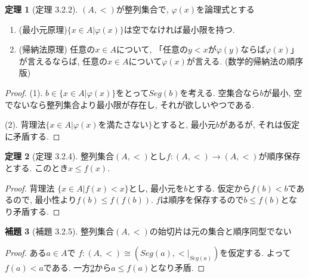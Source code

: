 \documentclass[dvipdfmx,a4paper,11pt]{report}
\theoremstyle{definition}
\newtheorem{thm}{定理}
\newtheorem{lem}[thm]{補題}
\begin{document}
 \begin{tcolorbox}
 [colback = white, colframe = green!35!black, fonttitle = \bfseries,breakable = true]
 \begin{thm}[定理 3.2.2]
 $(A,<)$が整列集合で, $\varphi(x)$を論理式とする
 \begin{enumerate}
 \item (最小元原理)$\{ x \in A | \varphi (x) \}$は空でなければ最小限を持つ.
 \item (帰納法原理) 任意の$x \in A$について, 「任意の$y<x$が$\varphi(y)$ならば$\varphi(x)$」が言えるならば, 任意の$x \in A$について$\varphi(x)$が言える. (数学的帰納法の順序版)
 \end{enumerate}
 \end{thm}
 \end{tcolorbox}
 \begin{proof}
 (1). $b \in \{ x \in A | \varphi (x)\}$をとって$Seg(b)$を考える. 空集合なら$b$が最小, 空でないなら整列集合より最小限が存在し, それが欲しいやつである.
 
 (2). 背理法$\{ x \in A | \varphi (x)\text{を満たさない}\}$とすると, 最小元$b$があるが, それは仮定に矛盾する. 
 \end{proof}

 \begin{tcolorbox}
 [colback = white, colframe = green!35!black, fonttitle = \bfseries,breakable = true]
\begin{thm}[定理 3.2.4]
\label{thm-tanaka-3.2.4}
整列集合$(A,<)$とし$f : (A,<) \to (A,<)$が順序保存とする. 
このとき$x \le f(x)$.
\end{thm}
\end{tcolorbox}
\begin{proof}
背理法 $\{ x \in A | f(x) <x \}$とし, 最小元を$b$とする. 
仮定から$f(b) < b$であるので, 最小性より$f(b) \le f(f(b))$. $f$は順序を保存するので$b \le f(b)$となり矛盾する. 
\end{proof}

 \begin{tcolorbox}
 [colback = white, colframe = green!35!black, fonttitle = \bfseries,breakable = true]
\begin{lem}[補題 3.2.5]
整列集合$(A,<)$の始切片は元の集合と順序同型でない
\end{lem}
\end{tcolorbox}
\begin{proof}
ある$a \in A$で
$f: (A,<) \cong (Seg(a), <|_{Seg(a)})$を仮定する. 
よって$f(a) < a$である.
一方\ref{thm-tanaka-3.2.4}から$a \le f(a)$となり矛盾.
\end{proof}
\end{document}
